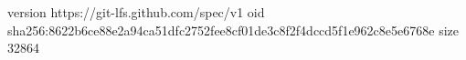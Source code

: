 version https://git-lfs.github.com/spec/v1
oid sha256:8622b6ce88e2a94ca51dfc2752fee8cf01de3c8f2f4dccd5f1e962c8e5e6768e
size 32864
